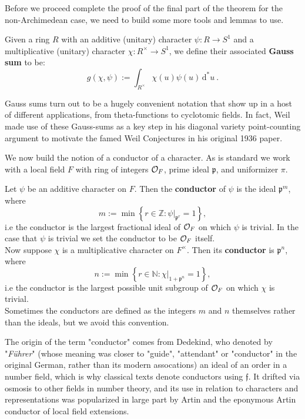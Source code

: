 \documentclass[11pt, x11names]{book}
\newcommand{\nn}{\mathbb{N}}
\newcommand{\zz}{\mathbb{Z}}
\newcommand{\pp}{\mathfrak{p}}
\newcommand{\frakf}{\mathfrak{f}}
\newcommand{\set}[1]{\left\{ #1 \right\}}
\renewcommand{\d}[1]{\, \mathrm{d}#1 \ }
\begin{document}
Before we proceed complete the proof of the final part of the theorem for the non-Archimedean case, we need to build some more tools and lemmas to use.
\begin{defn}
    \label{def: Gauss sum}
    Given a ring $R$ with an additive (unitary) character $\psi: R \to S^1$ and a multiplicative (unitary) character $\chi: R^\times \to S^1$, we define their associated \textbf{Gauss sum} to be:
    \begin{equation*}
        g(\chi, \psi) := \int_{R^\times} \chi(u) \psi(u) \d{^*u}.
    \end{equation*}
    \end{defn}
    \begin{remark}
        Gauss sums turn out to be a hugely convenient notation that show up in a host of different applications, from theta-functions to cyclotomic fields. In fact, Weil made use of these Gauss-sums as a key step in his diagonal variety point-counting argument to motivate the famed Weil Conjectures in his original 1936 paper.
    \end{remark}


We now build the notion of a conductor of a character. As is standard we work with a local field $F$ with ring of integers $\mathcal{O}_F$, prime ideal $\pp$, and  uniformizer $\pi$.
\begin{defn}
\label{def: conductor}
Let $\psi$ be an additive character on $F$. Then the \textbf{conductor} of $\psi$ is the ideal $\pp^m$, where 
\begin{equation*}
    m := \min \set{r \in \zz : \psi \vert_{\pp^r} = 1},
\end{equation*}
i.e the conductor is the largest fractional ideal of $\mathcal{O}_F$ on which $\psi$ is trivial. In the case that $\psi$ is trivial we set the conductor to be $\mathcal{O}_F$ itself.\\
Now suppose $\chi$ is a multiplicative character on $F^\times$. Then its \textbf{conductor} is $\pp^n$, where
\begin{equation*}
    n := \min \set{r \in \nn : \chi \vert_{1 + \pp^n} = 1},
\end{equation*}
i.e the conductor is the largest possible unit subgroup of $\mathcal{O}_F$ on which $\chi$ is trivial.\\
Sometimes the conductors are defined as the integers $m$ and $n$ themselves rather than the ideals, but we avoid this convention.
\end{defn}
\begin{remark}[Terminology]
    The origin of the term "conductor" comes from Dedekind, who denoted by "\textit{F\"uhrer}" (whose meaning was closer to "guide", "attendant" or "conductor" in the original German, rather than its modern assocations) an ideal of an order in a number field, which is why classical texts denote conductors using $\frakf$. It drifted via osmosis to other fields in number theory, and its use in relation to characters and representations was popularized in large part by Artin and the eponymous Artin conductor of local field extensions.
\end{remark}
\end{document}
